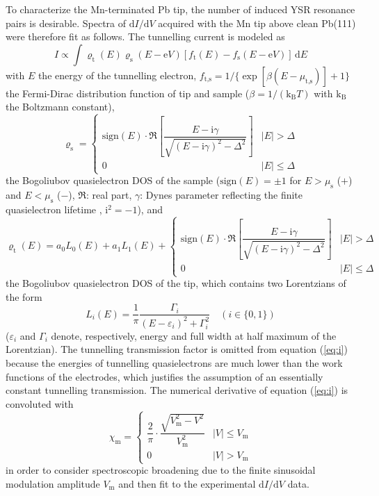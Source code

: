 \documentclass[aps,floatfix,12pt]{revtex4-2}
\begin{document}
To characterize the Mn-terminated Pb tip, the number of induced YSR resonance pairs is desirable.
Spectra of $\text{d}I/\text{d}V$ acquired with the Mn tip above clean Pb(111) were therefore fit as follows.
The tunnelling current is modeled as
\begin{equation}
I\propto\int\varrho_\text{t}(E)\varrho_\text{s}(E-\text{e}V)[f_\text{t}(E)-f_\text{s}(E-\text{e}V)]\,\text{d}E
\label{eq:i}
\end{equation}
with $E$ the energy of the tunnelling electron, $f_\text{t,s}=1/\{\exp[\beta(E-\mu_\text{t,s})]+1\}$ the Fermi-Dirac distribution function of tip and sample ($\beta=1/(\text{k}_\text{B}T)$ with $\text{k}_\text{B}$ the Boltzmann constant),
\begin{equation}
\varrho_\text{s}=\left\{
\begin{array}{ll}
\text{sign}(E)\cdot\Re\left[\dfrac{E-\text{i}\gamma}{\sqrt{(E-\text{i}\gamma)^2-\Delta^2}}\right] & \vert E\vert>\Delta \\
0 & \vert E\vert\leq\Delta
\end{array}
\right.
\label{eq:doss}
\end{equation}
the Bogoliubov quasielectron DOS of the sample ($\text{sign}(E)=\pm 1$ for $E>\mu_\text{s}$ ($+$) and $E<\mu_\text{s}$ ($-$), $\Re$: real part, $\gamma$: Dynes parameter reflecting the finite quasielectron lifetime \cite{prl_41_1509}, $\text{i}^2=-1$), and
\begin{equation}
\varrho_\text{t}(E)=a_0L_0(E)+a_1L_1(E)+\left\{
\begin{array}{ll}
\text{sign}(E)\cdot\Re\left[\dfrac{E-\text{i}\gamma}{\sqrt{(E-\text{i}\gamma)^2-\Delta^2}}\right] & \vert E\vert>\Delta \\
0 & \vert E\vert\leq\Delta
\end{array}
\right.
\label{eq:dost}
\end{equation}
the Bogoliubov quasielectron DOS of the tip, which contains two Lorentzians of the form
\begin{equation}
L_i(E)=\frac{1}{\pi}\frac{\Gamma_i}{(E-\varepsilon_i)^2+\Gamma_i^2}\quad (i\in\{0,1\})
\label{eq:lor}
\end{equation}
($\varepsilon_i$ and $\Gamma_i$ denote, respectively, energy and full width at half maximum of the Lorentzian)\@.
The tunnelling transmission factor is omitted from equation (\ref{eq:i}) because the energies of tunnelling quasielectrons are much lower than the work functions of the electrodes, which justifies the assumption of an essentially constant tunnelling transmission.
The numerical derivative of equation (\ref{eq:i}) is convoluted with
\begin{equation}
\chi_\text{m}=\left\{
\begin{array}{ll}
\dfrac{2}{\pi}\cdot\dfrac{\sqrt{V_\text{m}^2-V^2}}{V_\text{m}^2} & \vert V\vert\leq V_\text{m} \\
0 & \vert V\vert>V_\text{m}
\end{array}
\right.
\label{eq:mod}
\end{equation}
in order to consider spectroscopic broadening due to the finite sinusoidal modulation amplitude $V_\text{m}$ and then fit to the experimental $\text{d}I/\text{d}V$ data.
\end{document}
